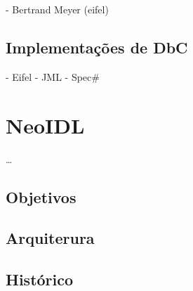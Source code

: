 - Bertrand Meyer (eifel)

\subsection{Implementações de DbC}

 - Eifel
 - JML
 - Spec\#


\section{NeoIDL}
\vspace{-6mm}

\ldots

\subsection{Objetivos}
\vspace{-6mm}


\subsection{Arquiterura}
\vspace{-6mm}


\subsection{Histórico}
\vspace{-6mm}
